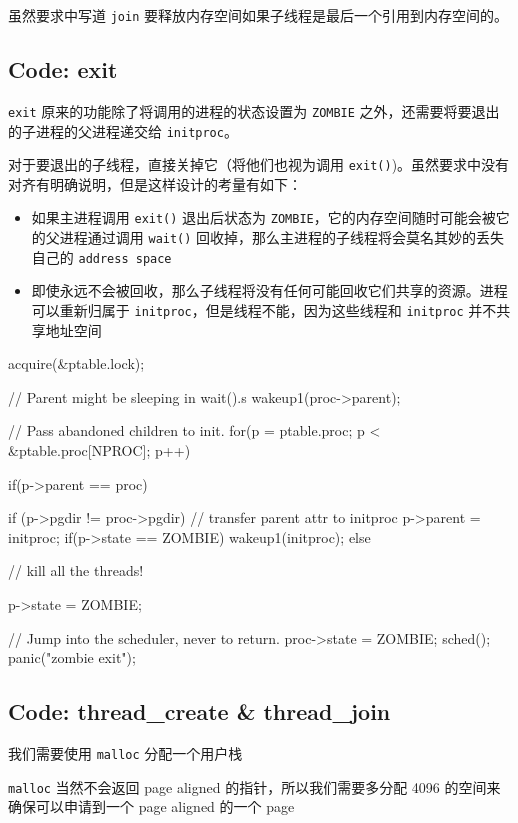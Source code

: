 虽然要求中写道 \texttt{join} 要释放内存空间如果子线程是最后一个引用到内存空间的。

\subsection{Code: exit}

\texttt{exit} 原来的功能除了将调用的进程的状态设置为 \texttt{ZOMBIE} 之外，还需要将要退出的子进程的父进程递交给 \texttt{initproc}。

对于要退出的子线程，直接关掉它（将他们也视为调用 \texttt{exit()})。虽然要求中没有对齐有明确说明，但是这样设计的考量有如下：

\begin{itemize}
	\item 如果主进程调用 \texttt{exit()} 退出后状态为 \texttt{ZOMBIE}，它的内存空间随时可能会被它的父进程通过调用 \texttt{wait()} 回收掉，那么主进程的子线程将会莫名其妙的丢失自己的 \texttt{address space}
	\item 即使永远不会被回收，那么子线程将没有任何可能回收它们共享的资源。进程可以重新归属于 \texttt{initproc}，但是线程不能，因为这些线程和 \texttt{initproc} 并不共享地址空间
\end{itemize}

\begin{ccode}
	acquire(&ptable.lock);
			
	// Parent might be sleeping in wait().s
	wakeup1(proc->parent);
			
	// Pass abandoned children to init.
	for(p = ptable.proc; p < &ptable.proc[NPROC]; p++){
		if(p->parent == proc){
			if (p->pgdir != proc->pgdir) {
				// transfer parent attr to initproc
				p->parent = initproc;
				if(p->state == ZOMBIE)
				wakeup1(initproc);
				} else {
				// kill all the threads!
												        
				p->state = ZOMBIE;
			}
		}
	}
			
	// Jump into the scheduler, never to return.
	proc->state = ZOMBIE;
	sched();
	panic("zombie exit");
\end{ccode}


\subsection{Code: thread\_create \& thread\_join}

我们需要使用 \texttt{malloc} 分配一个用户栈

\texttt{malloc} 当然不会返回 page aligned 的指针，所以我们需要多分配 4096 的空间来确保可以申请到一个 page aligned 的一个 page

